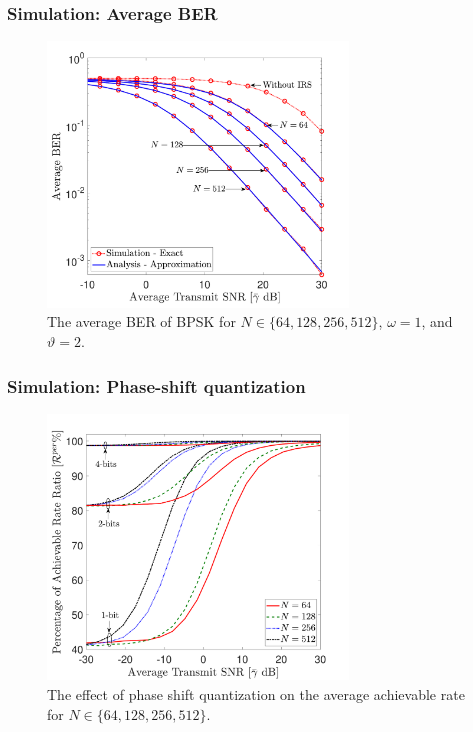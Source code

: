 \documentclass[article,mathserif,10pt,envcountsect]{beamer}
\begin{document}
\begin{frame}
\frametitle{Simulation: Average BER}
\vspace{-2.6mm}
\begin{figure}
	\centering
	\includegraphics[width=8cm]{ber_L_64_128_256_512_without}\vspace{-3mm}
	\caption{The average BER of BPSK for $N \in \{64,128,256,512\}$, $\omega=1$, and $\vartheta=2$.}
	\label{fig:ber_L_64_128_256_512_without}
\end{figure}
\end{frame}
\begin{frame}
	\frametitle{Simulation: Phase-shift quantization}
	\vspace{-2.6mm}
	\begin{figure}
		\centering
		\includegraphics[width=8cm]{Rate_gain_q}\vspace{-3mm}
		\caption{The effect of phase shift quantization on the average achievable rate for $N \in \{64,128,256,512\}$.}
		\label{fig:Rate_gain_q}
	\end{figure}
\end{frame}
\end{document}
